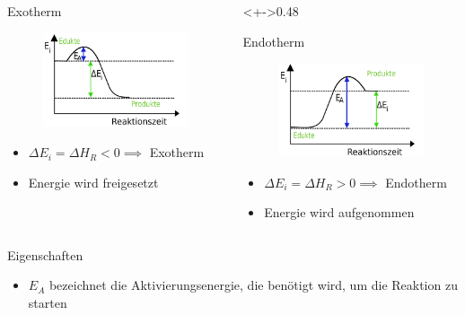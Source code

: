 	\begin{columns}
	\begin{column}{0.48\textwidth}
	\begin{block}{Exotherm}
	\begin{figure}[H]
		\includegraphics[width=0.6\columnwidth]{../exotherm_enthalpie.png}
	\end{figure}
	\begin{itemize}
		\item<+-> $\Delta E_i = \Delta H_R < 0 \implies$ Exotherm
		\item<+-> Energie wird freigesetzt
	\end{itemize}
	\end{block}
	\end{column}
	\begin{column}<+->{0.48\textwidth}
	\begin{block}{Endotherm}
	\begin{figure}[H]
		\includegraphics[width=0.6\columnwidth]{../endotherm_enthalpie.png}
	\end{figure}
	\begin{itemize}
		\item<+-> $\Delta E_i = \Delta H_R > 0 \implies$ Endotherm
		\item<+-> Energie wird aufgenommen
	\end{itemize}
	\end{block}
	\end{column}
	\end{columns}
	\begin{block}{Eigenschaften}
	\begin{itemize}
		\item<+-> $E_A$ bezeichnet die Aktivierungsenergie, die benötigt wird, um die Reaktion zu starten 
	\end{itemize}
	\end{block}

